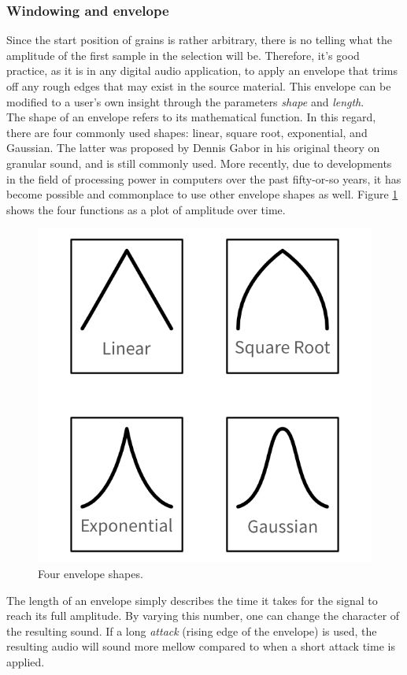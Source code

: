 \documentclass[10pt, twocolumn]{IEEEtran}
\begin{document}
\subsubsection{Windowing and envelope}
Since the start position of grains is rather arbitrary, there is no telling what the amplitude of the first sample in the selection will be. Therefore, it's good practice, as it is in any digital audio application, to apply an envelope that trims off any rough edges that may exist in the source material. This envelope can be modified to a user's own insight through the parameters \textit{shape} and \textit{length}. \\
The shape of an envelope refers to its mathematical function. In this regard, there are four commonly used shapes: linear, square root, exponential, and Gaussian. The latter was proposed by Dennis Gabor in his original theory on granular sound, and is still commonly used. More recently, due to developments in the field of processing power in computers over the past fifty-or-so years, it has become possible and commonplace to use other envelope shapes as well. Figure \ref{fig:env_shapes} shows the four functions as a plot of amplitude over time.

\begin{figure}[ht!]
	\centering
	\includegraphics[width=0.5\linewidth]{env_shapes.png}
	\caption{Four envelope shapes.}
	\label{fig:env_shapes}
\end{figure}

The length of an envelope simply describes the time it takes for the signal to reach its full amplitude. By varying this number, one can change the character of the resulting sound. If a long \textit{attack} (rising edge of the envelope) is used, the resulting audio will sound more mellow compared to when a short attack time is applied.\\
\end{document}
